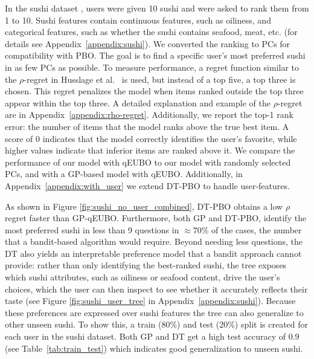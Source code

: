 \documentclass{article}
\begin{document}
 In the sushi dataset \cite{kamishima2003nantonac}, users were given 10 sushi and were asked to rank them from 1 to 10. Sushi features contain continuous features, such as oiliness, and categorical features, such as whether the sushi contains seafood, meat, etc. (for details see Appendix~\ref{appendix:sushi}). We converted the ranking to PCs for compatibility with PBO. The goal is to find a specific user's most preferred sushi in as few PCs as possible. To measure performance, a regret function similar to the $\rho$-regret in Husslage et al.~\cite{husslage_ranking_2015} is used, but instead of a top five, a top three is chosen. This regret penalizes the model when items ranked outside the top three appear within the top three. A detailed explanation and example of the $\rho$-regret are in Appendix~\ref{appendix:rho-regret}. Additionally, we report the top-1 rank error: the number of items that the model ranks above the true best item. A score of 0 indicates that the model correctly identifies the user's favorite, while higher values indicate that inferior items are ranked above it. We compare the performance of our model with qEUBO to our model with randomly selected PCs, and with a GP-based model with qEUBO. Additionally, in Appendix~\ref{appendix:with_user} we extend DT-PBO to handle user-features.

As shown in Figure \ref{fig:sushi_no_user_combined}, DT-PBO obtains a low $\rho$ regret faster than GP-qEUBO. Furthermore, both GP and DT-PBO, identify the most preferred sushi in less than 9 questions in $\approx70\%$ of the cases, the number that a bandit-based algorithm would require. Beyond needing less questions, the DT also yields an interpretable preference model that a bandit approach cannot provide: rather than only identifying the best-ranked sushi, the tree exposes which sushi attributes, such as oiliness or seafood content, drive the user's choices, which the user can then inspect to see whether it accurately reflects their taste (see Figure \ref{fig:sushi_user_tree} in Appendix~\ref{appendix:sushi}). Because these preferences are expressed over sushi features the tree can also generalize to other unseen sushi. To show this, a train (80\%) and test (20\%) split is created for each user in the sushi dataset. Both GP and DT get a high test accuracy of $0.9$ (see Table~\ref{tab:train_test}) which indicates good generalization to unseen sushi.
 
\end{document}
